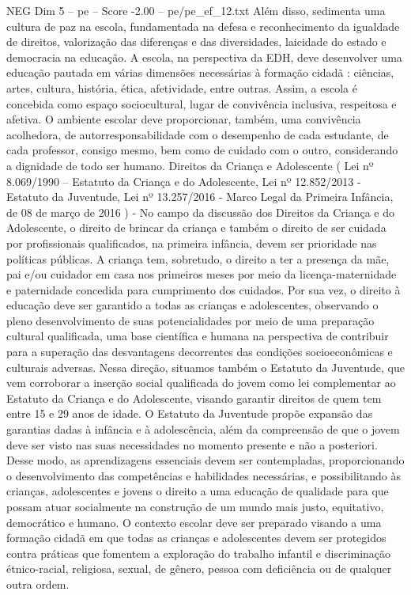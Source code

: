 \begin{textsample}{NEG Dim 5 – pe – Score -2.00 – pe/pe\_ef\_12.txt}
Além disso, sedimenta uma cultura de paz na escola, fundamentada na defesa e reconhecimento da igualdade de direitos, valorização das diferenças e das diversidades, laicidade do estado e democracia na educação.
A escola, na perspectiva da EDH, deve desenvolver uma educação pautada em várias dimensões necessárias à formação cidadã : ciências, artes, cultura, história, ética, afetividade, entre outras.
Assim, a escola é concebida como espaço sociocultural, lugar de convivência inclusiva, respeitosa e afetiva.
O ambiente escolar deve proporcionar, também, uma convivência acolhedora, de autorresponsabilidade com o desempenho de cada estudante, de cada professor, consigo mesmo, bem como de cuidado com o outro, considerando a dignidade de todo ser humano.
Direitos da Criança e Adolescente ( Lei nº 8.069/1990 – Estatuto da Criança e do Adolescente, Lei nº 12.852/2013 - Estatuto da Juventude, Lei nº 13.257/2016 - Marco Legal da Primeira Infância, de 08 de março de 2016 ) - No campo da discussão dos Direitos da Criança e do Adolescente, o direito de brincar da criança e também o direito de ser cuidada por profissionais qualificados, na primeira infância, devem ser prioridade nas políticas públicas.
A criança tem, sobretudo, o direito a ter a presença da mãe, pai e/ou cuidador em casa nos primeiros meses por meio da licença-maternidade e paternidade concedida para cumprimento dos cuidados.
Por sua vez, o direito à educação deve ser garantido a todas as crianças e adolescentes, observando o pleno desenvolvimento de suas potencialidades por meio de uma preparação cultural qualificada, uma base científica e humana na perspectiva de contribuir para a superação das desvantagens decorrentes das condições socioeconômicas e culturais adversas.
Nessa direção, situamos também o Estatuto da Juventude, que vem corroborar a inserção social qualificada do jovem como lei complementar ao Estatuto da Criança e do Adolescente, visando garantir direitos de quem tem entre 15 e 29 anos de idade.
O Estatuto da Juventude propõe expansão das garantias dadas à infância e à adolescência, além da compreensão de que o jovem deve ser visto nas suas necessidades no momento presente e não a posteriori.
Desse modo, as aprendizagens essenciais devem ser contempladas, proporcionando o desenvolvimento das competências e habilidades necessárias, e possibilitando às crianças, adolescentes e jovens o direito a uma educação de qualidade para que possam atuar socialmente na construção de um mundo mais justo, equitativo, democrático e humano.
O contexto escolar deve ser preparado visando a uma formação cidadã em que todas as crianças e adolescentes devem ser protegidos contra práticas que fomentem a exploração do trabalho infantil e discriminação étnico-racial, religiosa, sexual, de gênero, pessoa com deficiência ou de qualquer outra ordem.

\end{textsample}
